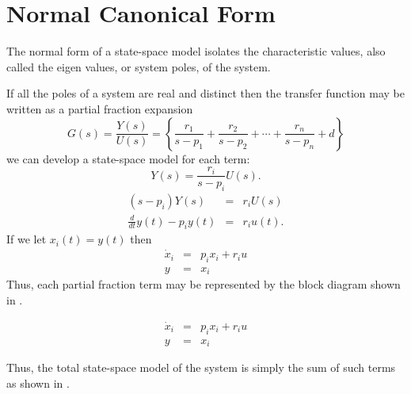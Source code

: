 \section*{Normal Canonical Form}
The normal form of
a state-space model isolates the characteristic values, also
called the eigen values, or system poles, of the system.

If all the poles of a system are real and distinct then the
transfer function may be written as a partial fraction expansion
\[ G(s) = \frac{Y(s)}{U(s)} = \left\{\frac{r_1}{s-p_1} +
\frac{r_2}{s-p_2} + \cdots + \frac{r_n}{s-p_n} + d\right\}
\]
we can develop a state-space model for each term:
\[Y(s)=\frac{r_i}{s-p_i}U(s).\]
\begin{eqnarray*}
(s-p_i)Y(s) & = & r_i U(s)\\ \frac{d}{dt}y(t)-p_i y(t) &=& r_i
u(t).\end{eqnarray*} If we let $x_i(t) = y(t)$ then
\begin{eqnarray*}
\dot{x}_i &=& p_i x_i + r_i u \\ y &=& x_i
\end{eqnarray*}
Thus, each partial fraction term may be represented by the block
diagram shown in .
\begin{slide}\label{slide:l6s1}
\begin{eqnarray*}
\dot{x}_i &=& p_i x_i + r_i u \\ y &=& x_i
\end{eqnarray*}
\end{slide}
Thus, the total state-space model of the system is simply the sum
of such terms as shown in .
\begin{slide}\label{slide:l6s2}
\end{slide}

